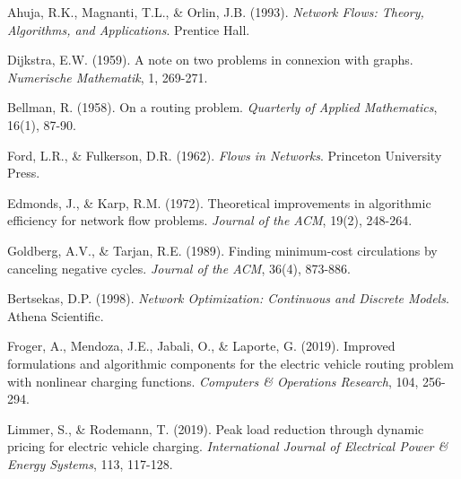 \documentclass[12pt,a4paper]{article}
\begin{document}

\begin{thebibliography}{9}

Ahuja, R.K., Magnanti, T.L., \& Orlin, J.B. (1993). \textit{Network Flows: Theory, Algorithms, and Applications}. Prentice Hall.

Dijkstra, E.W. (1959). A note on two problems in connexion with graphs. \textit{Numerische Mathematik}, 1, 269-271.

Bellman, R. (1958). On a routing problem. \textit{Quarterly of Applied Mathematics}, 16(1), 87-90.

Ford, L.R., \& Fulkerson, D.R. (1962). \textit{Flows in Networks}. Princeton University Press.

Edmonds, J., \& Karp, R.M. (1972). Theoretical improvements in algorithmic efficiency for network flow problems. \textit{Journal of the ACM}, 19(2), 248-264.

Goldberg, A.V., \& Tarjan, R.E. (1989). Finding minimum-cost circulations by canceling negative cycles. \textit{Journal of the ACM}, 36(4), 873-886.

Bertsekas, D.P. (1998). \textit{Network Optimization: Continuous and Discrete Models}. Athena Scientific.

Froger, A., Mendoza, J.E., Jabali, O., \& Laporte, G. (2019). Improved formulations and algorithmic components for the electric vehicle routing problem with nonlinear charging functions. \textit{Computers \& Operations Research}, 104, 256-294.

Limmer, S., \& Rodemann, T. (2019). Peak load reduction through dynamic pricing for electric vehicle charging. \textit{International Journal of Electrical Power \& Energy Systems}, 113, 117-128.

\end{thebibliography}
\end{document}
